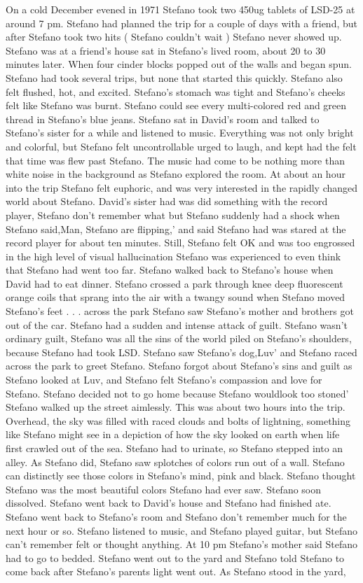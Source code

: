 \documentclass[12pt]{book}
\begin{document}
On a cold December evened in 1971 Stefano took two 450ug tablets of LSD-25 at around 7 pm. Stefano had planned the trip for a couple of days with a friend, but after Stefano took two hits ( Stefano couldn't wait ) Stefano never showed up. Stefano was at a friend's house sat in Stefano's lived room, about 20 to 30 minutes later. When four cinder blocks popped out of the walls and began spun. Stefano had took several trips, but none that started this quickly. Stefano also felt flushed, hot, and excited. Stefano's stomach was tight and Stefano's cheeks felt like Stefano was burnt. Stefano could see every multi-colored red and green thread in Stefano's blue jeans. Stefano sat in David's room and talked to Stefano's sister for a while and listened to music. Everything was not only bright and colorful, but Stefano felt uncontrollable urged to laugh, and kept had the felt that time was flew past Stefano. The music had come to be nothing more than white noise in the background as Stefano explored the room. At about an hour into the trip Stefano felt euphoric, and was very interested in the rapidly changed world about Stefano. David's sister had was did something with the record player, Stefano don't remember what but Stefano suddenly had a shock when Stefano said,Man, Stefano are flipping,' and said Stefano had was stared at the record player for about ten minutes. Still, Stefano felt OK and was too engrossed in the high level of visual hallucination Stefano was experienced to even think that Stefano had went too far. Stefano walked back to Stefano's house when David had to eat dinner. Stefano crossed a park through knee deep fluorescent orange coils that sprang into the air with a twangy sound when Stefano moved Stefano's feet . . . across the park Stefano saw Stefano's mother and brothers got out of the car. Stefano had a sudden and intense attack of guilt. Stefano wasn't ordinary guilt, Stefano was all the sins of the world piled on Stefano's shoulders, because Stefano had took LSD. Stefano saw Stefano's dog,Luv' and Stefano raced across the park to greet Stefano. Stefano forgot about Stefano's sins and guilt as Stefano looked at Luv, and Stefano felt Stefano's compassion and love for Stefano. Stefano decided not to go home because Stefano wouldlook too stoned' Stefano walked up the street aimlessly. This was about two hours into the trip. Overhead, the sky was filled with raced clouds and bolts of lightning, something like Stefano might see in a depiction of how the sky looked on earth when life first crawled out of the sea. Stefano had to urinate, so Stefano stepped into an alley. As Stefano did, Stefano saw splotches of colors run out of a wall. Stefano can distinctly see those colors in Stefano's mind, pink and black. Stefano thought Stefano was the most beautiful colors Stefano had ever saw. Stefano soon dissolved. Stefano went back to David's house and Stefano had finished ate. Stefano went back to Stefano's room and Stefano don't remember much for the next hour or so. Stefano listened to music, and Stefano played guitar, but Stefano can't remember felt or thought anything. At 10 pm Stefano's mother said Stefano had to go to bedded. Stefano went out to the yard and Stefano told Stefano to come back after Stefano's parents light went out. As Stefano stood in the yard, 
\end{document}

